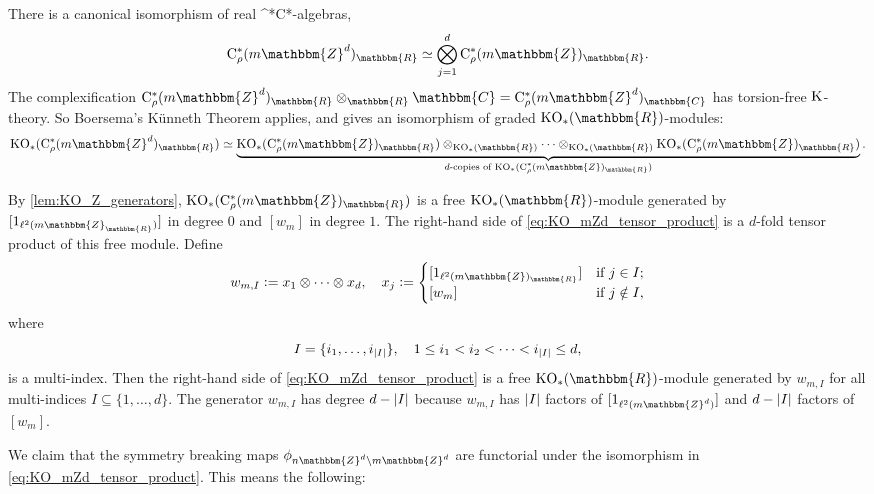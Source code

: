 \documentclass{amsart}
\numberwithin{figure}{section}
\numberwithin{equation}{section}
\numberwithin{table}{section}
\theoremstyle{plain}
\theoremstyle{definition}
\theoremstyle{remark}
\theoremstyle{nonumber}
\newcommand{\Z}{\mathbb{Z}}
\newcommand{\R}{\mathbb{R}}
\newcommand{\C}{\mathbb{C}}
\newcommand{\K}{\relax\ifmmode\operatorname{K}\else\textup{K}\fi}
\newcommand{\KO}{\relax\ifmmode\operatorname{KO}\else\textup{KO}\fi}
\newcommand{\Cst}{\relax\ifmmode\mathrm{C}^*\else\textup{C*}\fi}
\newcommand{\Cstr}{\Cst_\rho} %
\newcommand{\defeq}{\mathrel{\vcentcolon=}}
\renewcommand{\mathbb}{\mathbbm} %
\DeclarePairedDelimiter{\abs}{\lvert}{\rvert} %
\begin{document}
There is a canonical isomorphism of real \Cst-algebras,
\begin{equation}\label{eq:basis_induce_tensor}
\Cstr(m\Z^d)_\R\simeq\bigotimes_{j=1}^d \Cstr(m\Z)_\R.
\end{equation}
The complexification 
$\Cstr(m\Z^d)_\R\otimes_\R\C=\Cstr(m\Z^d)_\C$ has
torsion-free $\K$-theory.
So Boersema's K\"unneth Theorem applies,
and gives an isomorphism of graded \( \KO_*(\R) \)-modules: 
\begin{equation}\label{eq:KO_mZd_tensor_product}
  \KO_*( \Cstr(m\Z^d)_{\R})\simeq
  \underbrace{\KO_*(
  \Cstr(m\Z)_{\R})\otimes_{\KO_*(\R)}\cdots\otimes_{\KO_*(\R)}\KO_*( \Cstr(m\Z)_{\R})}_{\text{\(
  d\)-copies of \( \KO_*( \Cstr(m\Z)_{\R}) \)} }.
\end{equation}

By \cref{lem:KO_Z_generators}, \( \KO_*(\Cstr(m\Z)_{\R}) \) is a free \(
\KO_*(\R) \)-module generated by \( [1_{\ell^2(m\Z_\R)}] \) in degree \( 0
\) and \( [w_m] \) in degree \( 1 \). 
The right-hand side of \eqref{eq:KO_mZd_tensor_product} is
a \( d \)-fold tensor product of this free module. Define
\begin{equation}\label{eq:d-dim_KO-generators}
  w_{m,I}\defeq x_1\otimes\dots\otimes x_d,\quad x_j\defeq \begin{cases}
  [1_{\ell^2(m\Z)_\R}] & \text{if \( j\in I\);} \\
  [w_m] & \text{if \( j\notin I \),} 
  \end{cases}
\end{equation}
where
\[
  I=\{i_1,\dots,i_{\abs{I}}\},\quad 1\leq i_1<i_2<\dots<i_{\abs{I}}\leq d,
\]
is a multi-index. Then the right-hand side of
\eqref{eq:KO_mZd_tensor_product} is a free \( \KO_*(\R) \)-module generated
by \( w_{m,I} \) for all multi-indices \( I\subseteq \{1,\dots,d\} \). The
generator \( w_{m,I} \) has
degree \( d-\abs{I} \) because 
$w_{m,I}$ has $\abs{I}$ factors of $[1_{\ell^2(m\Z^d)}]$ and \( d-\abs{I}
\) factors of \( [w_m] \).  

We claim that the symmetry breaking maps \( \phi_{n\Z^d\backslash m\Z^d} \) 
are functorial under the isomorphism in \eqref{eq:KO_mZd_tensor_product}. 
This means the following:
\end{document}
